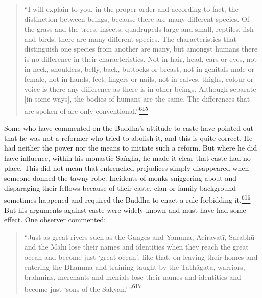 \begin{quote}
``I will explain to you, in the proper order and according to fact, the
distinction between beings, because there are many different species. Of
the grass and the trees, insects, quadrupeds large and small, reptiles,
fish and birds, there are many different species. The characteristics
that distinguish one species from another are many, but amongst humans
there is no difference in their characteristics. Not in hair, head, ears
or eyes, not in neck, shoulders, belly, back, buttocks or breast, not in
genitals male or female, not in hands, feet, fingers or nails, not in
calves, thighs, colour or voice is there any difference as there is in
other beings. Although separate {[}in some ways{]}, the bodies of humans
are the same. The differences that are spoken of are only
conventional.''\label{footprints_split_015.html_fnref615}\hyperref[footprints_split_025.htmlux5cux23fn615]{\textsuperscript{615}}
\end{quote}

Some who have commented on the Buddha's attitude to caste have pointed
out that he was not a reformer who tried to abolish it, and this is
quite correct. He had neither the power nor the means to initiate such a
reform. But where he did have influence, within his monastic Saṅgha, he
made it clear that caste had no place. This did not mean that entrenched
prejudices simply disappeared when someone donned the tawny robe.
Incidents of monks sniggering about and disparaging their fellows
because of their caste, clan or family background sometimes happened and
required the Buddha to enact a rule forbidding
it.\label{footprints_split_015.html_fnref616}\hyperref[footprints_split_025.htmlux5cux23fn616]{\textsuperscript{616}}
But his arguments against caste were widely known and must have had some
effect. One observer commented:

\begin{quote}
``Just as great rivers such as the Ganges and Yamuna, Aciravatī, Sarabhū
and the Mahī lose their names and identities when they reach the great
ocean and become just `great ocean', like that, on leaving their homes
and entering the Dhamma and training taught by the Tathāgata, warriors,
brahmins, merchants and menials lose their names and identities and
become just `sons of the
Sakyan.'\,''\label{footprints_split_015.html_fnref617}\hyperref[footprints_split_025.htmlux5cux23fn617]{\textsuperscript{617}}
\end{quote}

